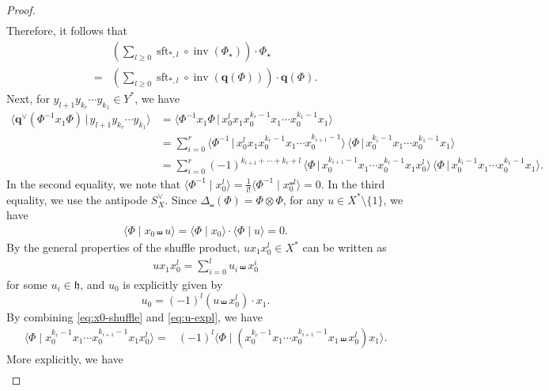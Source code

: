 \documentclass[15pt,oneside,reqno]{amsart}
\theoremstyle{remark}{
\newtheorem{lem}[df]{Lemma}
\newtheorem{prop}[df]{Proposition}
\newtheorem{ex}[df]{Example}
\newtheorem{rmk}[df]{Remark}
}
\newcommand{\ide}[1]{\mathfrak{#1}}
\DeclareMathOperator{\inv}{inv}
\DeclareMathOperator{\sft}{sft}
\begin{document}
\begin{proof}
\begin{align*}
\end{align*}
Therefore, it follows that
\begin{align*}
&\left(\sum_{l\ge 0}  \sft_{*,l} \circ \inv  (\Phi_{\star}) \right) \cdot \Phi_{\star} \\
=&\left(\sum_{l\ge 0}  \sft_{*,l} \circ \inv (\mathbf{q}(\Phi)) \right) \cdot \mathbf{q}(\Phi).
\end{align*}
Next, for $y_{l+1}y_{k_r}\cdots y_{k_1}\in Y^*$, we have
{\small
\begin{align*}
\bigl\langle \mathbf{q}^{\vee}(\Phi^{-1}x_1\Phi)\,\big|\, y_{l+1}y_{k_r}\cdots y_{k_1}\bigr\rangle
&=
\bigl\langle \Phi^{-1}x_1\Phi \,\big|\, x_0^{l}x_1x_0^{k_r-1}x_1\cdots x_0^{k_1-1}x_1\bigr\rangle \\
&=
\sum_{i=0}^{r}
\bigl\langle \Phi^{-1}\,\big|\, x_0^{l}x_1x_0^{k_r-1}x_1\cdots x_0^{k_{i+1}-1}\bigr\rangle\,
\bigl\langle \Phi\,\big|\, x_0^{k_i-1}x_1\cdots x_0^{k_1-1}x_1\bigr\rangle \\
&=
\sum_{i=0}^{r}(-1)^{k_{i+1}+\cdots+k_r+l}\,
\bigl\langle \Phi\,\big|\, x_0^{k_{i+1}-1}x_1\cdots x_0^{k_r-1}x_1x_0^{l}\bigr\rangle\,
\bigl\langle \Phi\,\big|\, x_0^{k_i-1}x_1\cdots x_0^{k_1-1}x_1\bigr\rangle .
\end{align*}
}
In the second equality, we note that $\langle \Phi^{-1} \mid x_0^l\rangle = \frac{1}{l!} \langle \Phi^{-1} \mid x_0^{\shuffle l}\rangle = 0$.
In the third equality, we use the antipode $S_X^{\vee}$.
Since $\Delta_{\shuffle}(\Phi)=\Phi\otimes\Phi$, for any $u\in X^*\setminus\{1\}$, we have
\begin{align}
\langle \Phi \mid x_0\shuffle u\rangle
=
\langle\Phi \mid x_0\rangle\cdot \langle\Phi \mid u\rangle
=
0. \label{eq:x0-shuffle}
\end{align}
By the general properties of the shuffle product, $ux_1x_0^l \in X^*$ can be written as
\begin{align}
ux_1x_0^l = \sum_{i = 0}^l u_i \shuffle x_0^{i} \label{eq:u-expl}
\end{align}
for some $u_i \in \ide{h}$, and $u_0$ is explicitly given by 
\[
u_0 = (-1)^l (u\shuffle x_0^{l})\cdot x_1.
\]
By  combining \eqref{eq:x0-shuffle} and \eqref{eq:u-expl}, we have
\begin{align*}
\langle \Phi \mid  x_0^{k_r-1}x_1\cdots x_0^{k_{i+1}-1}x_1x_0^l \rangle =& (-1)^l \langle \Phi \mid   ( x_0^{k_r-1}x_1\cdots x_0^{k_{i+1}-1}x_1 \shuffle x_0^{l})x_1 \rangle.
\end{align*}
More explicitly, we have
{\small
\begin{align*}

\end{align*}}
\end{proof}
\end{document}
